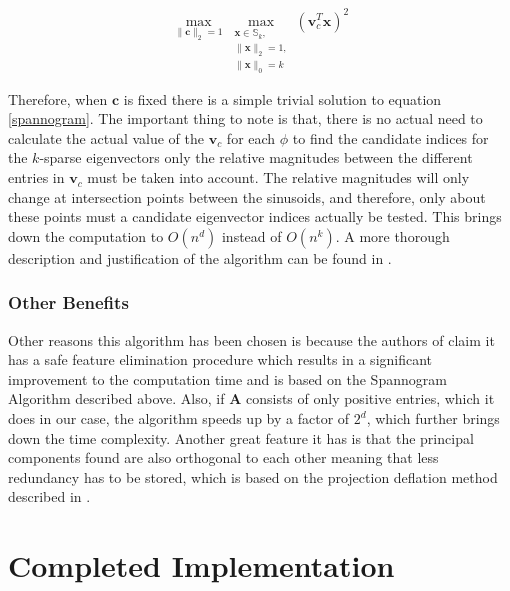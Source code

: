 \documentclass[11pt,a4paper]{article}
\begin{document}
\begin{equation}
\max_{\|\mathbf{c}\|_2 =1} \max_{\substack{\mathbf{x} \in\mathbb{S}_k, \\ \|\mathbf{x}\|_2 = 1, \\ \|\mathbf{x}\|_0 = k}}\left(\mathbf{v}_c^T \mathbf{x}\right)^2 
\label{spannogram}
\end{equation}

Therefore, when $\mathbf{c}$ is fixed there is a simple trivial solution to  equation \ref{spannogram}. The important thing to note is that, there is no actual need to calculate the actual value of the $\mathbf{v}_c$ for each $\phi$ to find the candidate indices for the $k$-sparse eigenvectors only the relative magnitudes between the different entries in  $\mathbf{v}_c$ must be taken into account. The relative magnitudes will only change at intersection points between the sinusoids, and therefore, only about these points must a candidate eigenvector indices actually be tested. This brings down the computation to $O \left(n^d\right)$ instead of $O \left(n^k\right)$. A more thorough description and justification of the algorithm can be found in \cite{dimakis}.

\subsubsection{Other Benefits}
Other reasons this algorithm has been chosen is because the authors of \cite{dimakis} claim it has a safe feature elimination procedure which results in a significant improvement to the computation time and is based on the Spannogram Algorithm described above. Also, if $\mathbf{A}$ consists of only positive entries, which it does in our case, the algorithm speeds up by a factor of $2^d$, which further brings down the time complexity. Another great feature it has is that the principal components found are also orthogonal to each other meaning that less redundancy has to be stored, which is based on the projection deflation method described in \cite{Mackey_deflationmethods}. 
\clearpage
\section{Completed Implementation}
\end{document}
